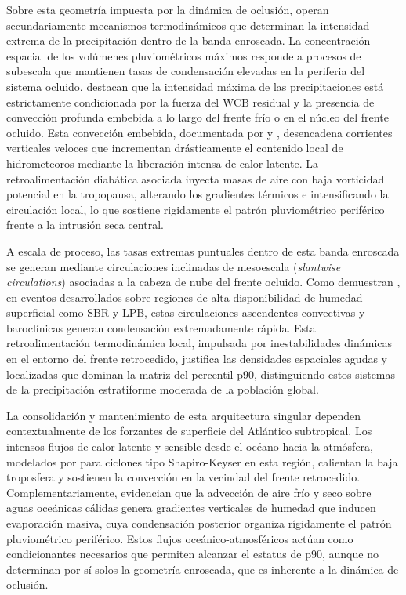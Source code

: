 Sobre esta geometría impuesta por la dinámica de oclusión, operan secundariamente mecanismos termodinámicos que determinan la intensidad extrema de la precipitación dentro de la banda enroscada. La concentración espacial de los volúmenes pluviométricos máximos responde a procesos de subescala que mantienen tasas de condensación elevadas en la periferia del sistema ocluido. \citet{priestley2022improved} destacan que la intensidad máxima de las precipitaciones está estrictamente condicionada por la fuerza del WCB residual y la presencia de convección profunda embebida a lo largo del frente frío o en el núcleo del frente ocluido. Esta convección embebida, documentada por \citet{oertel2021warm} y \citet{blanchard2021warm}, desencadena corrientes verticales veloces que incrementan drásticamente el contenido local de hidrometeoros mediante la liberación intensa de calor latente. La retroalimentación diabática asociada inyecta masas de aire con baja vorticidad potencial en la tropopausa, alterando los gradientes térmicos e intensificando la circulación local, lo que sostiene rigidamente el patrón pluviométrico periférico frente a la intrusión seca central.

A escala de proceso, las tasas extremas puntuales dentro de esta banda enroscada se generan mediante circulaciones inclinadas de mesoescala (\textit{slantwise circulations}) asociadas a la cabeza de nube del frente ocluido. Como demuestran \citet{clark2005sting}, en eventos desarrollados sobre regiones de alta disponibilidad de humedad superficial como SBR y LPB, estas circulaciones ascendentes convectivas y baroclínicas generan condensación extremadamente rápida. Esta retroalimentación termodinámica local, impulsada por inestabilidades dinámicas en el entorno del frente retrocedido, justifica las densidades espaciales agudas y localizadas que dominan la matriz del percentil p90, distinguiendo estos sistemas de la precipitación estratiforme moderada de la población global.

La consolidación y mantenimiento de esta arquitectura singular dependen contextualmente de los forzantes de superficie del Atlántico subtropical. Los intensos flujos de calor latente y sensible desde el océano hacia la atmósfera, modelados por \citet{gozzo2013air} para ciclones tipo Shapiro-Keyser en esta región, calientan la baja troposfera y sostienen la convección en la vecindad del frente retrocedido. Complementariamente, \citet{andrade2024composite} evidencian que la advección de aire frío y seco sobre aguas oceánicas cálidas genera gradientes verticales de humedad que inducen evaporación masiva, cuya condensación posterior organiza rígidamente el patrón pluviométrico periférico. Estos flujos oceánico-atmosféricos actúan como condicionantes necesarios que permiten alcanzar el estatus de p90, aunque no determinan por sí solos la geometría enroscada, que es inherente a la dinámica de oclusión.

